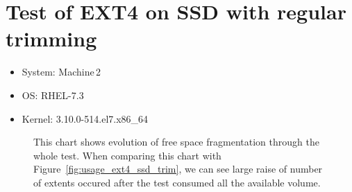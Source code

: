\documentclass[
  color, %
  table, %
  lof,   %
  lot,   %
]{fithesis3}
\begin{document}
\section{Test of EXT4 on SSD with regular trimming}
\begin{itemize}
\itemsep0em 
   \item System: Machine\,2
   \item OS: RHEL-7.3
   \item Kernel: 3.10.0-514.el7.x86\_64
\end{itemize}

\begin{figure}[h]
    \centering
    \caption[Evolution of free space fragmentation of EXT4 during testing on SSD with regular trimming]{This chart shows evolution of free space fragmentation through the whole test. When comparing this chart with Figure~\ref{fig:usage_ext4_ssd_trim}, we can see large raise of number of extents occured after the test consumed all the available volume.}
    \label{fig:free_ext4_ssd}
\end{figure}
\end{document}
